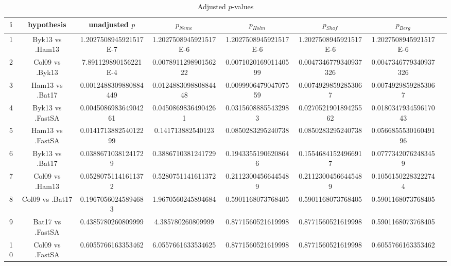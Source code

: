 \documentclass[a4paper,10pt]{article}
\begin{document}
\begin{landscape}
\begin{table}[!htp]
\centering\tiny
\caption{Adjusted $p$-values}
\begin{tabular}{cccccccc}
i&hypothesis&unadjusted $p$&$p_{Neme}$&$p_{Holm}$&$p_{Shaf}$&$p_{Berg}$\\
\hline
1&Byk13 vs .Ham13&1.2027508945921517E-7&1.2027508945921517E-6&1.2027508945921517E-6&1.2027508945921517E-6&1.2027508945921517E-6\\
2&Col09 vs .Byk13&7.891129890156221E-4&0.007891129890156222&0.007102016901140599&0.0047346779340937326&0.0047346779340937326\\
3&Ham13 vs .Bat17&0.0012488309880884449&0.012488309880884448&0.009990647904707559&0.00749298592853067&0.00749298592853067\\
4&Byk13 vs .FastSA&0.004508698364904261&0.04508698364904261&0.03156088855432983&0.027052190189425562&0.018034793459617043\\
5&Ham13 vs .FastSA&0.014171388254012299&0.141713882540123&0.0850283295240738&0.0850283295240738&0.056685553016049196\\
6&Byk13 vs .Bat17&0.03886710381241729&0.3886710381241729&0.19433551906208646&0.15546841524966917&0.07773420762483459\\
7&Col09 vs .Ham13&0.05280751141611372&0.5280751141611372&0.21123004566445489&0.21123004566445489&0.10561502283222744\\
8&Col09 vs .Bat17&0.19670560245894683&1.9670560245894684&0.5901168073768405&0.5901168073768405&0.5901168073768405\\
9&Bat17 vs .FastSA&0.4385780260809999&4.385780260809999&0.8771560521619998&0.8771560521619998&0.5901168073768405\\
10&Col09 vs .FastSA&0.6055766163353462&6.0557661633534625&0.8771560521619998&0.8771560521619998&0.6055766163353462\\
\hline
\end{tabular}
\end{table}

\end{landscape}
\end{document}
